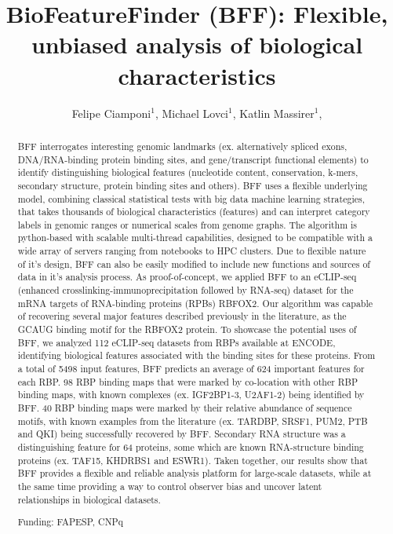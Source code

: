 \documentclass[twoside]{article}
\title{\vspace{-15mm}\fontsize{24pt}{10pt}\selectfont\textbf{ BioFeatureFinder (BFF): Flexible, unbiased analysis of biological characteristics }} %
\author{ Felipe Ciamponi$^{1}$, Michael Lovci$^{1}$, Katlin Massirer$^{1}$, }
\affil{ 1 CBMEG - UNICAMP

 }
\date{}
\begin{document}
  
  
  \maketitle %
  
  
  \thispagestyle{fancy} %
  
  
  \begin{abstract}
  BFF interrogates interesting genomic landmarks (ex. alternatively spliced exons, DNA/RNA-binding protein binding sites, and gene/transcript functional elements) to identify distinguishing biological features (nucleotide content, conservation, k-mers, secondary structure, protein binding sites and others). BFF uses a flexible underlying model, combining classical statistical tests with big data machine learning strategies, that takes thousands of biological characteristics (features) and can interpret category labels in genomic ranges or numerical scales from genome graphs. The algorithm is python-based with scalable multi-thread capabilities, designed to be compatible with a wide array of servers ranging from notebooks to HPC clusters. Due to flexible nature of it’s design, BFF can also be easily modified to include new functions and sources of data in it’s analysis process. As proof-of-concept, we applied BFF to an eCLIP-seq (enhanced crosslinking-immunoprecipitation followed by RNA-seq) dataset for the mRNA targets of RNA-binding proteins (RPBs) RBFOX2. Our algorithm was capable of recovering several major features described previously in the literature, as the GCAUG binding motif for the RBFOX2 protein. To showcase the potential uses of BFF, we analyzed 112 eCLIP-seq datasets from RBPs available at ENCODE, identifying biological features associated with the binding sites for these proteins. From a total of 5498 input features, BFF predicts an average of  624 important features for each RBP. 98 RBP binding maps that were marked by co-location with other RBP binding maps, with  known complexes (ex. IGF2BP1-3, U2AF1-2) being identified by BFF. 40 RBP binding maps were marked by their relative abundance of sequence motifs, with known examples from the literature (ex. TARDBP, SRSF1, PUM2, PTB and QKI) being successfully recovered by BFF. Secondary RNA structure was a distinguishing feature for 64 proteins, some which are known RNA-structure binding proteins (ex. TAF15, KHDRBS1 and ESWR1).  Taken together, our results show that BFF provides a flexible and reliable analysis platform for large-scale datasets, while at the same time providing a way to control observer bias and uncover latent relationships in biological datasets.
  
  Funding: FAPESP, CNPq \\ 
  \end{abstract}
  
\end{document}
